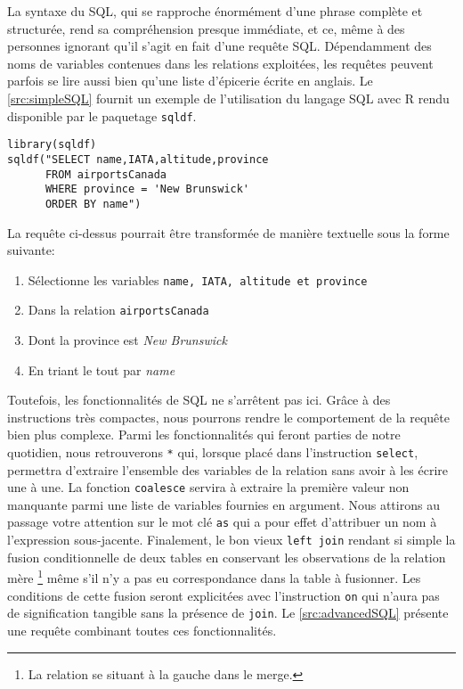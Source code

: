 La syntaxe du SQL, qui se rapproche énormément d'une phrase complète et structurée, rend sa compréhension presque immédiate, et ce, même à des personnes ignorant qu'il s'agit en fait d'une requête SQL. Dépendamment des noms de variables contenues dans les relations exploitées, les requêtes peuvent parfois se lire aussi bien qu'une liste d'épicerie écrite en anglais. Le \autoref{src:simpleSQL} fournit un exemple de l'utilisation du langage SQL avec R rendu disponible par le paquetage \texttt{sqldf}.

\begin{lstlisting}[caption = Exemple de requête SQL,label=src:simpleSQL]
library(sqldf)
sqldf("SELECT name,IATA,altitude,province
      FROM airportsCanada
      WHERE province = 'New Brunswick'
      ORDER BY name")
\end{lstlisting}

\vspace{\baselineskip}
La requête ci-dessus pourrait être transformée de manière textuelle sous la forme suivante:
\begin{enumerate}
	\item Sélectionne les variables \texttt{name, IATA, altitude et province}
	\item Dans la relation \texttt{airportsCanada}
	\item Dont la province est \emph{New Brunswick}
	\item En triant le tout par \emph{name}
\end{enumerate}

Toutefois, les fonctionnalités de SQL ne s'arrêtent pas ici. Grâce à des instructions très compactes, nous pourrons rendre le comportement de la requête bien plus complexe. Parmi les fonctionnalités qui feront parties de notre quotidien, nous retrouverons \texttt{*} qui, lorsque placé dans l'instruction \texttt{select}, permettra d'extraire l'ensemble des variables de la relation sans avoir à les écrire une à une. La fonction \texttt{coalesce} servira à extraire la première valeur non manquante parmi une liste de variables fournies en argument. Nous attirons au passage votre attention sur le mot clé \texttt{as} qui a pour effet d'attribuer un nom à l'expression sous-jacente. Finalement, le bon vieux \texttt{left join} rendant si simple la fusion conditionnelle de deux tables en conservant les observations de la relation mère \footnote{La relation se situant à la gauche dans le merge.} même s'il n'y a pas eu correspondance dans la table à fusionner. Les conditions de cette fusion seront explicitées avec l'instruction \texttt{on} qui n'aura pas de signification tangible sans la présence de \texttt{join}. Le \autoref{src:advancedSQL} présente une requête combinant toutes ces fonctionnalités.

